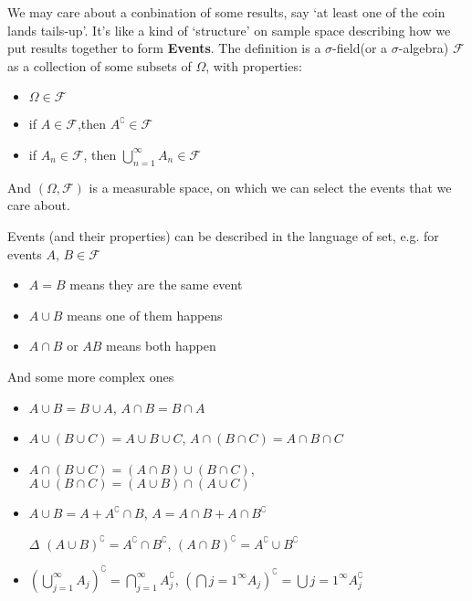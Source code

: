     We may care about a conbination of some results, say `at least one of the coin lands tails-up'. It's like a kind of `structure' on sample space describing how we put results together to form \textbf{Events}. The definition is  a $\sigma$-field(or a $\sigma$-algebra) $\mathscr{F}$ as a collection of some subsets of $\Omega$, with properties:
    \begin{itemize}[topsep=2pt,itemsep=0pt]
        \item $\Omega\in\mathscr{F}$
        \item if $A\in\mathscr{F}$,then $A^\complement \in\mathscr{F}$
        \item if $A_n\in\mathscr{F}$, then ${\displaystyle\bigcup_{n=1}^\infty} A_n\in\mathscr{F}$
    \end{itemize}

    And $(\Omega,\mathscr{F})$ is a measurable space, on which we can select the events that we care about.

    Events (and their properties) can be described in the language of set, e.g. for events $ A $, $ B\in\mathscr{F} $
\begin{itemize}[topsep=2pt,itemsep=0pt]
    \item $ A=B $ means they are the same event
    \item $ A\cup B $ means one of them happens
    \item $ A\cap B $ or $ AB $ means both happen 
\end{itemize}

And some more complex ones
\begin{itemize}[topsep=2pt,itemsep=0pt]
    \item $ A\cup B=B\cup A $, $ A\cap B=B\cap A $
    \item $ A\cup (B\cup C)=A\cup B\cup C $, $ A\cap (B\cap C)=A\cap B\cap C $
    \item $ A\cap (B\cup C)=(A\cap B)\cup (B\cap C) $, $ A\cup (B \cap C)=(A\cup B)\cap (A\cup C) $
    \item $ A\cup B=A+ A^\complement\cap B $, $ A=A\cap B+A\cap B^\complement $
    \item[$ \Delta  $] $ (A\cup B)^\complement =A^\complement\cap B^\complement $, $ (A\cap B)^\complement = A^\complement \cup B^\complement  $
    \item $ (\bigcup_{j=1}^\infty A_j)^\complement =\bigcap_{j=1}^\infty A_j^\complement $, $ (\bigcap{j=1}^\infty A_j)^\complement =\bigcup{j=1}^\infty A_j^\complement $
\end{itemize}
    
